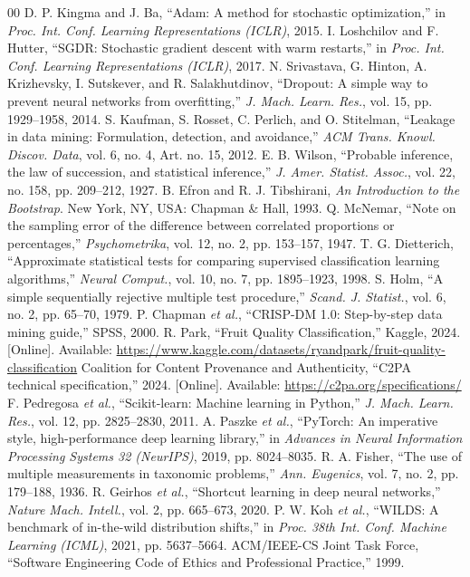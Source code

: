 \documentclass[conference]{IEEEtran}
\begin{document}
\begin{thebibliography}{00}
 D. P. Kingma and J. Ba, ``Adam: A method for stochastic optimization,'' in \textit{Proc. Int. Conf. Learning Representations (ICLR)}, 2015.
 I. Loshchilov and F. Hutter, ``SGDR: Stochastic gradient descent with warm restarts,'' in \textit{Proc. Int. Conf. Learning Representations (ICLR)}, 2017.
 N. Srivastava, G. Hinton, A. Krizhevsky, I. Sutskever, and R. Salakhutdinov, ``Dropout: A simple way to prevent neural networks from overfitting,'' \textit{J. Mach. Learn. Res.}, vol. 15, pp. 1929--1958, 2014.
 S. Kaufman, S. Rosset, C. Perlich, and O. Stitelman, ``Leakage in data mining: Formulation, detection, and avoidance,'' \textit{ACM Trans. Knowl. Discov. Data}, vol. 6, no. 4, Art. no. 15, 2012.
 E. B. Wilson, ``Probable inference, the law of succession, and statistical inference,'' \textit{J. Amer. Statist. Assoc.}, vol. 22, no. 158, pp. 209--212, 1927.
 B. Efron and R. J. Tibshirani, \textit{An Introduction to the Bootstrap}. New York, NY, USA: Chapman \& Hall, 1993.
 Q. McNemar, ``Note on the sampling error of the difference between correlated proportions or percentages,'' \textit{Psychometrika}, vol. 12, no. 2, pp. 153--157, 1947.
 T. G. Dietterich, ``Approximate statistical tests for comparing supervised classification learning algorithms,'' \textit{Neural Comput.}, vol. 10, no. 7, pp. 1895--1923, 1998.
 S. Holm, ``A simple sequentially rejective multiple test procedure,'' \textit{Scand. J. Statist.}, vol. 6, no. 2, pp. 65--70, 1979.
 P. Chapman \textit{et al.}, ``CRISP-DM 1.0: Step-by-step data mining guide,'' SPSS, 2000.
 R. Park, ``Fruit Quality Classification,'' Kaggle, 2024. [Online]. Available: \url{https://www.kaggle.com/datasets/ryandpark/fruit-quality-classification}
 Coalition for Content Provenance and Authenticity, ``C2PA technical specification,'' 2024. [Online]. Available: \url{https://c2pa.org/specifications/}
 F. Pedregosa \textit{et al.}, ``Scikit-learn: Machine learning in Python,'' \textit{J. Mach. Learn. Res.}, vol. 12, pp. 2825--2830, 2011.
 A. Paszke \textit{et al.}, ``PyTorch: An imperative style, high-performance deep learning library,'' in \textit{Advances in Neural Information Processing Systems 32 (NeurIPS)}, 2019, pp. 8024--8035.
 R. A. Fisher, ``The use of multiple measurements in taxonomic problems,'' \textit{Ann. Eugenics}, vol. 7, no. 2, pp. 179--188, 1936.
 R. Geirhos \textit{et al.}, ``Shortcut learning in deep neural networks,'' \textit{Nature Mach. Intell.}, vol. 2, pp. 665--673, 2020.
 P. W. Koh \textit{et al.}, ``WILDS: A benchmark of in-the-wild distribution shifts,'' in \textit{Proc. 38th Int. Conf. Machine Learning (ICML)}, 2021, pp. 5637--5664.
 ACM/IEEE-CS Joint Task Force, ``Software Engineering Code of Ethics and Professional Practice,'' 1999.
\end{thebibliography}
\end{document}

